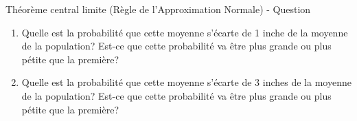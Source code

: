 \documentclass[
  ignorenonframetext,
]{beamer}
\providecommand{\tightlist}{%
  \setlength{\itemsep}{0pt}\setlength{\parskip}{0pt}}
\begin{document}
\begin{frame}{Théorème central limite (Règle de l'Approximation Normale)
- Question}
\protect\hypertarget{thuxe9oruxe8me-central-limite-ruxe8gle-de-lapproximation-normale---question}{}
\begin{enumerate}
\tightlist
\item
  Quelle est la probabilité que cette moyenne s'écarte de 1 inche de la
  moyenne de la population? Est-ce que cette probabilité va être plus
  grande ou plus pétite que la première?
\item
  Quelle est la probabilité que cette moyenne s'écarte de 3 inches de la
  moyenne de la population? Est-ce que cette probabilité va être plus
  grande ou plus pétite que la première?
\end{enumerate}
\end{frame}
\end{document}
